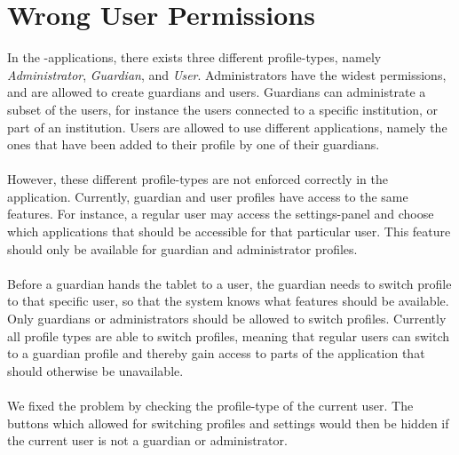 \section{Wrong User Permissions}
\label{sec:wrong_user_permissions}


In the \giraf-applications, there exists three different profile-types, namely \emph{Administrator}, \emph{Guardian}, and \emph{User}. Administrators have the widest permissions, and are allowed to create guardians and users. Guardians can administrate a subset of the users, for instance the users connected to a specific institution, or part of an institution. Users are allowed to use different applications, namely the ones that have been added to their profile by one of their guardians. 
\\\\
However, these different profile-types are not enforced correctly in the \launcher application. Currently, guardian and user profiles have access to the same features. For instance, a regular user may access the settings-panel and choose which applications that should be accessible for that particular user. This feature should only be available for guardian and administrator profiles.
\\\\
Before a guardian hands the tablet to a user, the guardian needs to switch profile to that specific user, so that the system knows what features should be available. Only guardians or administrators should be allowed to switch profiles. Currently all profile types are able to switch profiles, meaning that regular users can switch to a guardian profile and thereby gain access to parts of the application that should otherwise be unavailable.
\\\\
We fixed the problem by checking the profile-type of the current user. The buttons which allowed for switching profiles and settings would then be hidden if the current user is not a guardian or administrator.